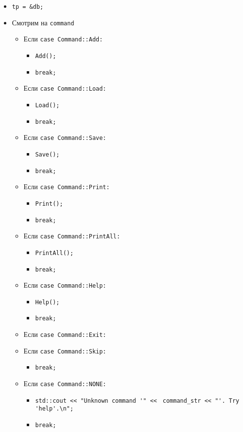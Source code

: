 \begin{itemize}
	\item \verb|tp = &db;|
	\item Смотрим на \verb|command|
		\begin{itemize}
			\item Если \verb|case Command::Add:|
				\begin{itemize}
					\item \verb|Add();|
					\item \verb|break;|
				\end{itemize}
			\item Если \verb|case Command::Load:|
				\begin{itemize}
					\item \verb|Load();|
					\item \verb|break;|
				\end{itemize}
			\item Если \verb|case Command::Save:|
				\begin{itemize}
					\item \verb|Save();|
					\item \verb|break;|
				\end{itemize}
			\item Если \verb|case Command::Print:|
				\begin{itemize}
					\item \verb|Print();|
					\item \verb|break;|
				\end{itemize}
			\item Если \verb|case Command::PrintAll:|
				\begin{itemize}
					\item \verb|PrintAll();|
					\item \verb|break;|
				\end{itemize}
			\item Если \verb|case Command::Help:|
				\begin{itemize}
					\item \verb|Help();|
					\item \verb|break;|
				\end{itemize}
			\item Если \verb|case Command::Exit:|
			\item Если \verb|case Command::Skip:|
				\begin{itemize}
					\item \verb|break;|
				\end{itemize}
			\item Если \verb|case Command::NONE:|
				\begin{itemize}
					\item \verb|std::cout << "Unknown command '" << |
					\verb|command_str << "'. Try 'help'.\n";|
					\item \verb|break;|
				\end{itemize}
		\end{itemize}
\end{itemize}


